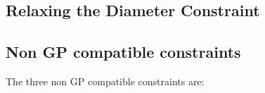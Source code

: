 \documentclass[12pt]{article}
\begin{document}
	\subsection{Relaxing the Diameter Constraint}
		
	\subsection{Non GP compatible constraints}
	The three non GP compatible constraints are:
	
	
	
\end{document}
